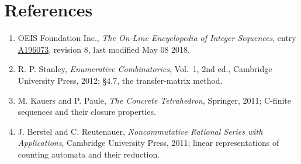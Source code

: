 \documentclass[11pt]{article}
\theoremstyle{definition}
\begin{document}
\section{References}

\begin{enumerate}

\item OEIS Foundation Inc., \emph{The On-Line Encyclopedia of Integer Sequences}, entry \href{https://oeis.org/A196073}{A196073}, revision 8, last modified May 08 2018.

\item R. P. Stanley, \emph{Enumerative Combinatorics}, Vol.~1, 2nd ed., Cambridge University Press, 2012; \S4.7, the transfer-matrix method.

\item M. Kauers and P. Paule, \emph{The Concrete Tetrahedron}, Springer, 2011; C-finite sequences and their closure properties.

\item J. Berstel and C. Reutenauer, \emph{Noncommutative Rational Series with Applications}, Cambridge University Press, 2011; linear representations of counting automata and their reduction.

\end{enumerate}
\end{document}
